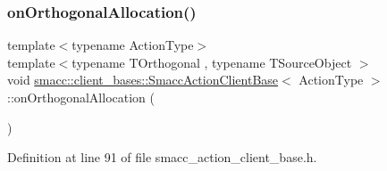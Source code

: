 \subsubsection{\texorpdfstring{on\+Orthogonal\+Allocation()}{onOrthogonalAllocation()}}
{\footnotesize\ttfamily template$<$typename Action\+Type$>$ \\
template$<$typename T\+Orthogonal , typename T\+Source\+Object $>$ \\
void \hyperlink{classsmacc_1_1client__bases_1_1SmaccActionClientBase}{smacc\+::client\+\_\+bases\+::\+Smacc\+Action\+Client\+Base}$<$ Action\+Type $>$\+::on\+Orthogonal\+Allocation (\begin{DoxyParamCaption}{ }\end{DoxyParamCaption})\hspace{0.3cm}{\ttfamily [inline]}}



Definition at line 91 of file smacc\+\_\+action\+\_\+client\+\_\+base.\+h.


